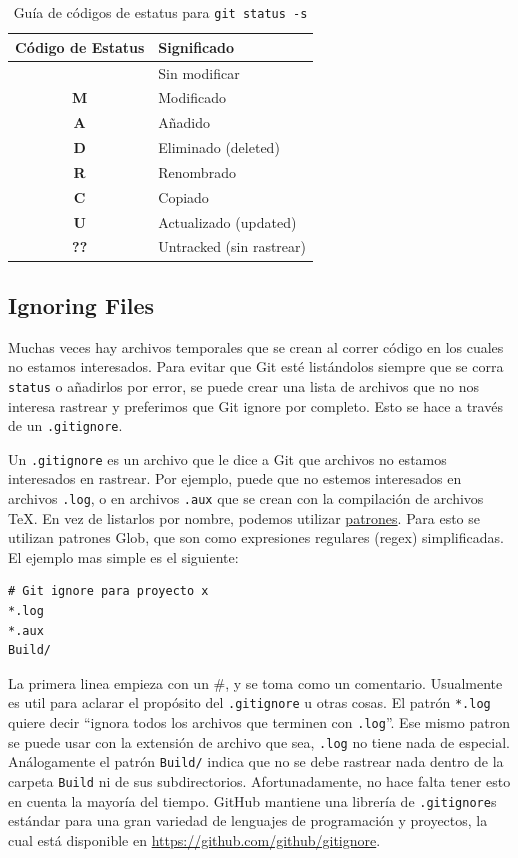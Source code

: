 \documentclass[spanish, 12pt, a4paper]{article}
\begin{document}
\begin{table}[h]
  \centering
  \begin{tabular}{|c|l|}
    \hline
    Código de Estatus & Significado \\
    \hline \hline
      & Sin modificar \\
    \hline
    \textbf{M} & Modificado \\
    \hline
    \textbf{A} & Añadido \\
    \hline
    \textbf{D} & Eliminado (deleted) \\
    \hline
    \textbf{R} & Renombrado \\
    \hline
    \textbf{C} & Copiado \\
    \hline
    \textbf{U} & Actualizado (updated)\\
    \hline
    \textbf{??} & Untracked (sin rastrear) \\
    \hline 
  \end{tabular}
  \caption{Guía de códigos de estatus para \texttt{git status -s}}
\end{table}

\subsection{Ignoring Files}
Muchas veces hay archivos temporales que se crean al correr código en los cuales no estamos interesados.
Para evitar que Git esté listándolos siempre que se corra \texttt{status} o añadirlos por error, se puede crear una lista de archivos que no nos interesa rastrear y preferimos que Git ignore por completo.
Esto se hace a través de un \texttt{.gitignore}.

Un \texttt{.gitignore} es un archivo que le dice a Git que archivos no estamos interesados en rastrear.
Por ejemplo, puede que no estemos interesados en archivos \texttt{.log}, o en archivos \texttt{.aux} que se crean con la compilación de archivos \TeX.
En vez de listarlos por nombre, podemos utilizar \underline{patrones}.
Para esto se utilizan patrones Glob, que son como expresiones regulares (regex) simplificadas.
El ejemplo mas simple es el siguiente:
\begin{lstlisting}
# Git ignore para proyecto x 
*.log
*.aux
Build/
\end{lstlisting}

La primera linea empieza con un \#, y se toma como un comentario.
Usualmente es util para aclarar el propósito del \texttt{.gitignore} u otras cosas.
El patrón \texttt{*.log} quiere decir ``ignora todos los archivos que terminen con \texttt{.log}''.
Ese mismo patron se puede usar con la extensión de archivo que sea, \texttt{.log} no tiene nada de especial.
Análogamente el patrón \texttt{Build/} indica que no se debe rastrear nada dentro de la carpeta \texttt{Build} ni de sus subdirectorios.
Afortunadamente, no hace falta tener esto en cuenta la mayoría del tiempo.
GitHub mantiene una librería de \texttt{.gitignore}s estándar para una gran variedad de lenguajes de programación y proyectos, la cual está disponible en \url{https://github.com/github/gitignore}.
\end{document}
